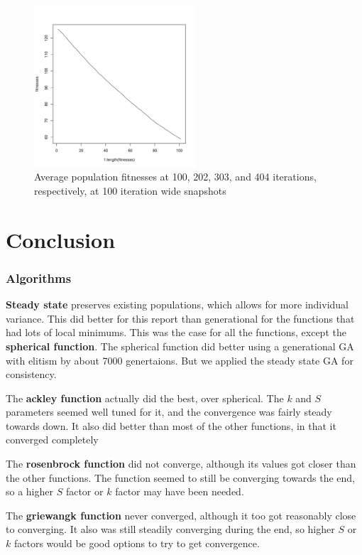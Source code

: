 \documentclass[12pt]{article}
\begin{document}
\begin{figure}[!h]
\begin{center}
		\includegraphics[width=60mm]{images/griewangk.ss/avg_404.pdf}
               	\caption{Average population fitnesses at 100, 202, 303, and 404 iterations, respectively, at 100 iteration wide snapshots}
                \label{griewangk_ss_avg_pop_fit}
        \end{center}
\end{figure}



\part{Conclusion}
\section{Algorithms}
\textbf{Steady state} preserves existing populations, which allows for more individual variance. This did better for this report than generational for the functions that had lots of local minimums. This was the case for all the functions, except the \textbf{spherical function}. The spherical function did better using a generational GA with elitism by about 7000 genertaions. But we applied the steady state GA for consistency.

The \textbf{ackley function} actually did the best, over spherical. The $ k $ and $ S $ parameters seemed well tuned for it, and the convergence was fairly steady towards down. It also did better than most of the other functions, in that it converged completely

The \textbf{rosenbrock function} did not converge, although its values got closer than the other functions. The function seemed to still be converging towards the end, so a higher $ S $ factor or $ k $ factor may have been needed.

The \textbf{griewangk function} never converged, although it too got reasonably close to converging. It also was still steadily converging during the end, so higher $ S $ or $ k $ factors would be good options to try to get convergence.
\end{document}
